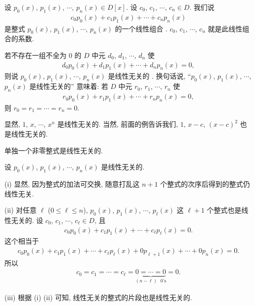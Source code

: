 \begin{definition}
    设 $p_0 (x)$, $p_1 (x)$, $\cdots$, $p_n (x) \in D[x]$. 设 $c_0$, $c_1$, $\cdots$, $c_n \in D$. 我们说
    \begin{align*}
        c_0 p_0 (x) + c_1 p_1 (x) + \cdots + c_n p_n (x)
    \end{align*}
    是整式 $p_0 (x)$, $p_1 (x)$, $\cdots$, $p_n (x)$ 的一个线性组合 . $c_0$, $c_1$, $\cdots$, $c_n$ 就是此线性组合的系数.

    若不存在一组不全为 $0$ 的 $D$ 中元 $d_0$, $d_1$, $\cdots$, $d_n$ 使
    \begin{align*}
        d_0 p_0 (x) + d_1 p_1 (x) + \cdots + d_n p_n (x) = 0,
    \end{align*}
    则说 $p_0 (x)$, $p_1 (x)$, $\cdots$, $p_n (x)$ 是线性无关的 . 换句话说, ``$p_0 (x)$, $p_1 (x)$, $\cdots$, $p_n (x)$ 是线性无关的'' 意味着: 若 $D$ 中元 $r_0$, $r_1$, $\cdots$, $r_n$ 使
    \begin{align*}
        r_0 p_0 (x) + r_1 p_1 (x) + \cdots + r_n p_n (x) = 0,
    \end{align*}
    则 $r_0 = r_1 = \cdots = r_n = 0$.
\end{definition}

\begin{example}
    显然, $1$, $x$, $\cdots$, $x^n$ 是线性无关的. 当然, 前面的例告诉我们, $1$, $x-c$, $(x-c)^2$ 也是线性无关的.
\end{example}

\begin{example}
    单独一个非零整式是线性无关的.
\end{example}

\begin{remark}
    设 $p_0 (x)$, $p_1 (x)$, $\cdots$, $p_n (x)$ 是线性无关的.

    (i) 显然, 因为整式的加法可交换, 随意打乱这 $n+1$ 个整式的次序后得到的整式仍线性无关.

    (ii) 对任意 $\ell$ ($0 \leq \ell \leq n$), $p_0 (x)$, $p_1 (x)$, $\cdots$, $p_{\ell} (x)$ 这 $\ell + 1$ 个整式也是线性无关的. 设 $c_0$, $c_1$, $\cdots$, $c_\ell \in D$, 且
    \begin{align*}
        c_0 p_0 (x) + c_1 p_1 (x) + \cdots + c_\ell p_\ell (x) = 0.
    \end{align*}
    这个相当于
    \begin{align*}
        c_0 p_0 (x) + c_1 p_1 (x) + \cdots + c_\ell p_\ell (x) + 0 p_{\ell+1} (x) + \cdots + 0 p_n (x) = 0.
    \end{align*}
    所以
    \begin{align*}
        c_0 = c_1 = \cdots = c_\ell = \underbrace{0 = \cdots = 0}_{(n - \ell)\text{ $0$'s}} = 0.
    \end{align*}

    (iii) 根据 (i) (ii) 可知, 线性无关的整式的片段也是线性无关的.
\end{remark}

